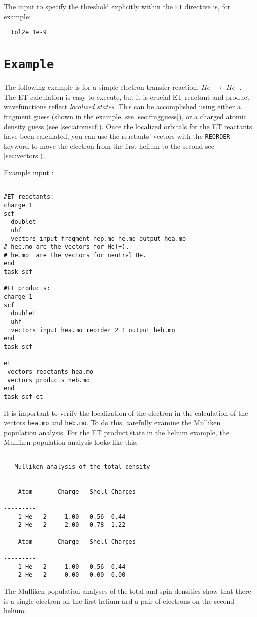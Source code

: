 The input to specify the threshold explicitly within the \verb+ET+
directive is, for example:

\begin{verbatim}
  tol2e 1e-9
\end{verbatim}

\section{{\tt Example}}

The following example is for a simple electron transfer reaction, $He_{}$ $\rightarrow$ $He^{ +}$.
The ET calculation is easy to execute, but it is crucial ET reactant and product
wavefunctions reflect {\em localized states}. This can be accomplished
using either a fragment guess (shown in the example, see \ref{sec:fragguess}), or a charged atomic
density guess (see \ref{sec:atomscf}). 
Once the localized orbitals for the ET reactants have been calculated, you can use the 
reactants' vectors with the
\verb+REORDER+ keyword to move the electron from the first helium to the second see \ref{sec:vectors}).

Example input :
\begin{verbatim}

#ET reactants:
charge 1
scf 
  doublet
  uhf
  vectors input fragment hep.mo he.mo output hea.mo 
# hep.mo are the vectors for He(+), 
# he.mo  are the vectors for neutral He.
end 
task scf

#ET products:
charge 1
scf 
  doublet
  uhf
  vectors input hea.mo reorder 2 1 output heb.mo 
end 
task scf

et
 vectors reactants hea.mo 
 vectors products heb.mo
end
task scf et       

\end{verbatim}
It is important to verify the localization of the electron in the calculation 
of the vectors \verb+hea.mo+ and \verb+heb.mo+. To do this, carefully examine the Mulliken population
analysis.  For the ET product state in the helium example, the Mulliken population
analysis looks like this:

\begin{verbatim}

   Mulliken analysis of the total density
   -------------------------------------

    Atom       Charge   Shell Charges
 -----------   ------   -------------------------------------------------------
    1 He   2     1.00   0.56  0.44
    2 He   2     2.00   0.78  1.22

    Atom       Charge   Shell Charges
 -----------   ------   -------------------------------------------------------
    1 He   2     1.00   0.56  0.44
    2 He   2     0.00   0.00  0.00
\end{verbatim}
The Mulliken population analyses of the total and spin densities show that there is a single electron on
the first helium and a pair of electrons on the second helium.  

